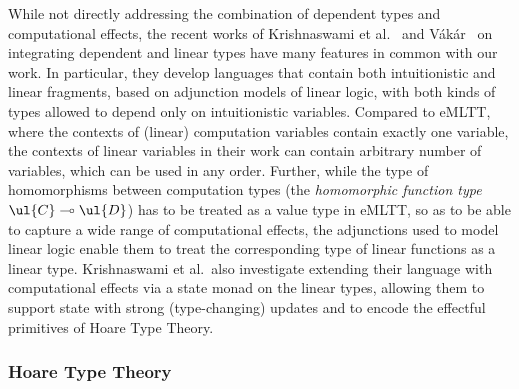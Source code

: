 While not directly addressing the combination of dependent types and computational effects, the recent works of Krishnaswami et al.~\cite{Krishnaswami:LinearDependentTypes} and V{\'{a}}k{\'{a}}r~\cite{Vakar:LinearLF} on integrating dependent and linear types have many features in common with our work. In particular, they develop languages that contain both intuitionistic and linear fragments,  based on adjunction models of linear logic, with both kinds of types allowed to depend only on intuitionistic variables. Compared to eMLTT, where the contexts of (linear) computation variables contain exactly one variable, the contexts of linear variables in their work can contain arbitrary number of variables, which can be used in any order.
%
Further, while the type of homomorphisms between computation types (the \emph{homomorphic function type} $\ul{C} \multimap \ul{D}$) has to be treated as a value type in eMLTT, so as to be able to capture a wide range of computational effects, the adjunctions used to model linear logic enable them to treat the corresponding type of linear functions as a linear type. 
Krishnaswami et al.~also investigate extending their language with computational effects via a state monad on the linear types, allowing them to support state with strong (type-changing) updates and to  encode the effectful primitives of Hoare Type Theory.

\subsubsection*{Hoare Type Theory}

